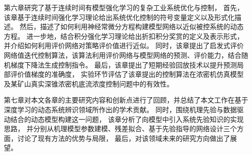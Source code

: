 第六章研究了基于连续时间有模型强化学习的复杂工业系统优化与控制，
首先，该章基于连续时间强化学习理论给出系统优化控制的符号变量定义以及形式化描述。
然后，描述了如何利用神经常微分方程构建模型网络以近似被控系统的动态方程。
进一步地，结合积分强化学习理论给出折扣积分奖赏的定义及表示形式，并介绍如何利用评价网络对策略评价值进行近似。
同时，该章提出了启发式评价网络值迭代控制算法，该算法利用评价网络与模型网络的预测、评价能力，结合随机梯度下降法生成控制指令。
最后，该章提出了短期经验回放技术以提升预测局部评价值梯度的准确度，
实验环节评估了该章提出的控制算法在浓密机仿真模型及某矿山真实深锥浓密机底流浓度控制问题中的有效性。

第七章对本文各章的主要研究内容和创新点进行了回顾，并总结了本文工作在基于深度学习的动态系统辨识领域所作出的学术贡献。
同时，围绕机理先验与数据驱动结合的动态模型构建这一问题，
该章分析了向模型中引入系统先验知识的实现思路，
并分别从机理模型参数建模、残差拟合、基于先验指导的网络设计三个方面，讨论了现有方法的优势与局限，
最后，对该领域未来的研究方向做出了展望。
